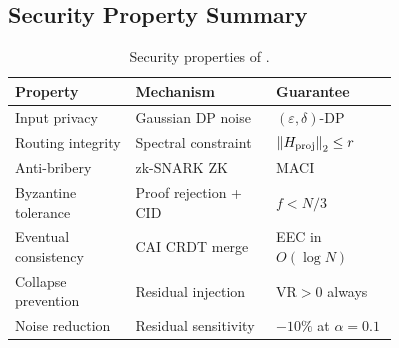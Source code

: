 \subsection{Security Property Summary}

\begin{table}[t]
  \centering
  \small
  \caption{Security properties of \fedsink{}.}
  \label{tab:security_properties}
  \renewcommand{\arraystretch}{1.1}
  \begin{tabular}{p{0.24\linewidth}p{0.28\linewidth}p{0.24\linewidth}}
    \toprule
    \textbf{Property} & \textbf{Mechanism} & \textbf{Guarantee} \\
    \midrule
    Input privacy        & Gaussian DP noise        & $(\varepsilon,\delta)$-DP \\
    Routing integrity    & Spectral constraint       & $\left\|H_{\mathrm{proj}}\right\|_2 \leq r$ \\
    Anti-bribery         & zk-SNARK ZK               & MACI \\
    Byzantine tolerance  & Proof rejection + CID     & $f < N/3$ \\
    Eventual consistency & CAI CRDT merge            & EEC in $O(\log N)$ \\
    Collapse prevention  & Residual injection        & $\mathrm{VR} > 0$ always \\
    Noise reduction      & Residual sensitivity      & $-10\%$ at $\alpha{=}0.1$ \\
    \bottomrule
  \end{tabular}
\end{table}
